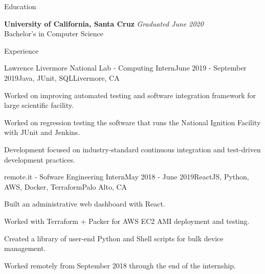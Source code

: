 \documentclass{resume} %
\begin{document}

\begin{rSection}{Education}

    {\bf University of California, Santa Cruz} \hfill {\em Graduated June 2020} \\ 
    Bachelor's in Computer Science

\end{rSection}




\begin{rSection}{Experience}
    \begin{rSubsection}{Lawrence Livermore National Lab - Computing Intern}{June 2019 - September 2019}{Java, JUnit, SQL}{Livermore, CA}
        \item Worked on improving automated testing and software integration framework for large scientific facility.
        \item Worked on regression testing the software that runs the National Ignition Facility with JUnit and Jenkins.
        \item Development focused on industry-standard continuous integration and test-driven development practices.
    \end{rSubsection}

    \begin{rSubsection}{remote.it - Sofware Engineering Intern}{May 2018 - June 2019}{ReactJS, Python, AWS, Docker, Terraform}{Palo Alto, CA}
        \item Built an administrative web dashboard with React.
        \item Worked with Terraform + Packer for AWS EC2 AMI deployment and testing.
        \item Created a library of user-end Python and Shell scripts for bulk device management.
        \item Worked remotely from September 2018 through the end of the internship.
    \end{rSubsection}

\end{rSection}
\end{document}
